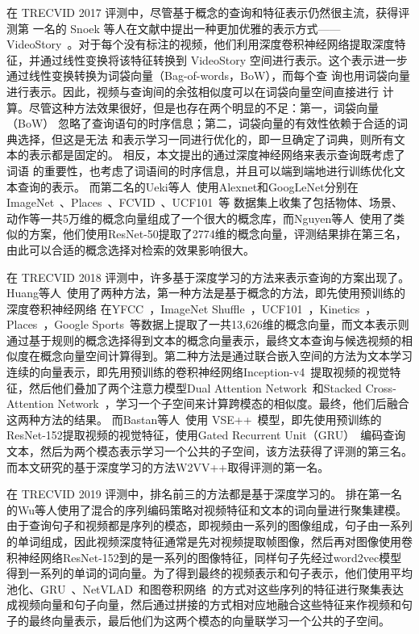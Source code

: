 在 TRECVID 2017 评测中，尽管基于概念的查询和特征表示仍然很主流，获得评测第
一名的 Snoek 等人在文献\cite{snoek2017university}中提出一种更加优雅的表示方式——VideoStory~\cite{habibian2014videostory}。对于每个没有标注的视频，他们利用深度卷积神经网络提取深度特征，并通过线性变换将该特征转换到
VideoStory 空间进行表示。这个表示进一步通过线性变换转换为词袋向量（Bag-of-words，BoW），而每个查
询也用词袋向量进行表示。因此，视频与查询间的余弦相似度可以在词袋向量空间直接进行
计算。尽管这种方法效果很好，但是也存在两个明显的不足：第一，词袋向量（BoW）
忽略了查询语句的时序信息；第二，词袋向量的有效性依赖于合适的词典选择，但这是无法
和表示学习一同进行优化的，即一旦确定了词典，则所有文本的表示都是固定的。
相反，本文提出的通过深度神经网络来表示查询既考虑了词语
的重要性，也考虑了词语间的时序信息，并且可以端到端地进行训练优化文本查询的表示。
而第二名的Ueki等人~\cite{ueki2017waseda}使用Alexnet和GoogLeNet分别在ImageNet~\cite{deng2009imagenet}、Places~\cite{zhou2014learning}、FCVID~\cite{jiang2017exploiting}、UCF101~\cite{soomro2012ucf101}等
数据集上收集了包括物体、场景、动作等一共5万维的概念向量组成了一个很大的概念库，而Nguyen等人~\cite{nguyen2017vireo}使用了类似的方案，他们使用ResNet-50提取了2774维的概念向量，评测结果排在第三名，由此可以合适的概念选择对检索的效果影响很大。

在 TRECVID 2018 评测中，许多基于深度学习的方法来表示查询的方案出现了。
Huang等人~\cite{huang2018informedia}使用了两种方法，第一种方法是基于概念的方法，即先使用预训练的深度卷积神经网络
在YFCC~\cite{thomee2016yfcc100m}，ImageNet Shuffle~\cite{mettes2016the}，UCF101~\cite{soomro2012ucf101}，Kinetics~\cite{carreira2017quo}，Places~\cite{zhou2014learning}，Google Sports~\cite{karpathy2014large}等数据上提取了一共13,626维的概念向量，而文本表示则通过基于规则的概念选择得到文本的概念向量表示，最终文本查询与候选视频的相似度在概念向量空间计算得到。第二种方法是通过联合嵌入空间的方法为文本学习连续的向量表示，即先用预训练的卷积神经网络Inception-v4~\cite{szegedy2016inception}提取视频的视觉特征，然后他们叠加了两个注意力模型Dual Attention Network~\cite{nam2017dual}和Stacked Cross-Attention Network~\cite{lee2018stacked}，学习一个子空间来计算跨模态的相似度。最终，他们后融合这两种方法的结果。
而Bastan等人~\cite{bastan2018ntu}使用 VSE++~\cite{faghri2017vse++}模型，即先使用预训练的ResNet-152提取视频的视觉特征，使用Gated Recurrent Unit（GRU）~\cite{cho2014learning}编码查询文本，然后为两个模态表示学习一个公共的子空间，该方法获得了评测的第三名。而本文研究的基于深度学习的方法W2VV++取得评测的第一名。

在 TRECVID 2019 评测中，排名前三的方法都是基于深度学习的。
排在第一名的Wu等人\cite{wu2019hybrid}使用了混合的序列编码策略对视频特征和文本的词向量进行聚集建模。由于查询句子和视频都是序列的模态，即视频由一系列的图像组成，句子由一系列的单词组成，因此视频深度特征通常是先对视频提取帧图像，然后再对图像使用卷积神经网络ResNet-152到的是一系列的图像特征，同样句子先经过word2vec模型得到一系列的单词的词向量。为了得到最终的视频表示和句子表示，他们使用平均池化、GRU~\cite{cho2014learning}、NetVLAD~\cite{arandjelovic2016netvlad}和图卷积网络~\cite{mao2018hierarchical}的方式对这些序列的特征进行聚集表达成视频向量和句子向量，然后通过拼接的方式相对应地融合这些特征来作视频和句子的最终向量表示，最后他们为这两个模态的向量联学习一个公共的子空间。

